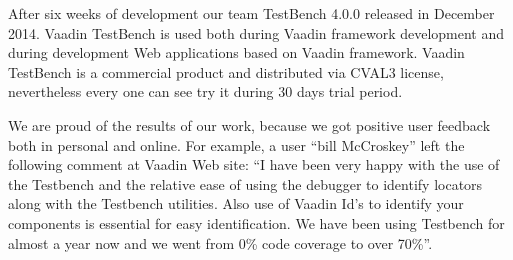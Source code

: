 After six weeks of development our team TestBench 4.0.0 released in December
2014.  Vaadin TestBench is used both during Vaadin framework development and
during development Web applications based on Vaadin framework. Vaadin TestBench is a commercial product
 and distributed via CVAL3 license,  nevertheless every one can see try it during 30 days trial period.
 
 We are proud of the results of our work, because we got positive user feedback
 both in personal and online. For example, a user ``bill McCroskey'' left the
 following comment at Vaadin Web site: ``I have been very happy with the use of
 the Testbench and the relative ease of using the debugger to identify locators
  along with the Testbench utilities. Also use of Vaadin Id's to identify your components
  is essential for easy identification. We have been using Testbench for almost 
  a year now and we went from 0\% code coverage to over 70\%''\cite{vaadinBlog}.


 
